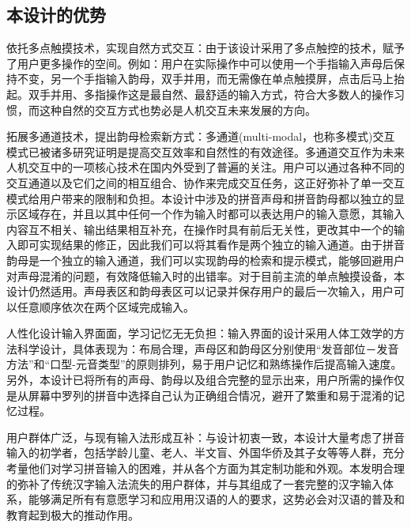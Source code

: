 
  \subsection{本设计的优势}

  依托多点触摸技术，实现⾃然⽅式交互：由于该设计采用了多点触控的技术，赋予了用户更多操作的空间。例如：用户在实际操作中可以使用一个手指输入声母后保持不变，另一个手指输入韵母，双手并用，而无需像在单点触摸屏，点击后马上抬起。双⼿并用、多指操作这是最自然、最舒适的输⼊方式，符合⼤多数⼈的操作习惯，而这种自然的交互⽅式也势必是人机交互未来发展的⽅向。

  拓展多通道技术，提出韵母检索新⽅式：多通道(multi-modal，也称多模式)交互模式已被诸多研究证明是提高交互效率和自然性的有效途径。多通道交互作为未来人机交互中的一项核心技术在国内外受到了普遍的关注。\supercite{dsh,lmz}用户可以通过各种不同的交互通道以及它们之间的相互组合、协作来完成交互任务，这正好弥补了单一交互模式给用户带来的限制和负担。本设计中涉及的拼⾳声母和拼⾳韵母都以独立的显示区域存在，并且以其中任何一个作为输⼊时都可以表达⽤户的输⼊意愿，其输入内容互不相关、输出结果相互补充，在操作时具有前后⽆关性，更改其中一个的输⼊即可实现结果的修正，因此我们可以将其看作是两个独立的输⼊通道。由于拼⾳韵母是一个独⽴的输⼊通道，我们可以实现韵母的检索和提示模式，能够回避⽤户对声母混淆的问题，有效降低输入时的出错率。对于⽬前主流的单点触摸设备，本设计仍然适用。声母表区和韵母表区可以记录并保存⽤户的最后一次输入，用户可以任意顺序依次在两个区域完成输入。

  人性化设计输入界⾯面，学习记忆⽆无负担：输入界面的设计采用人体工效学的方法科学设计，具体表现为：布局合理，声母区和韵母区分别使用“发音部位－发音方法”和“口型-元音类型”的原则排列，易于用户记忆和熟练操作后提高输入速度。另外，本设计已将所有的声母、韵母以及组合完整的显示出来，用户所需的操作仅是从屏幕中罗列的拼⾳中选择⾃己认为正确组合情况，避开了繁重和易于混淆的记忆过程。

  ⽤户群体广泛，与现有输⼊法形成互补：与设计初衷一致，本设计大量考虑了拼音输入的初学者，包括学龄儿童、老人、半文盲、外国华侨及其子女等等人群，充分考量他们对学习拼音输入的困难，并从各个方面为其定制功能和外观。本发明合理的弥补了传统汉字输入法流失的⽤户群体，并与其组成了一套完整的汉字输⼊体系，能够满足所有有意愿学习和应⽤用汉语的人的要求，这势必会对汉语的普及和教育起到极大的推动作用。
